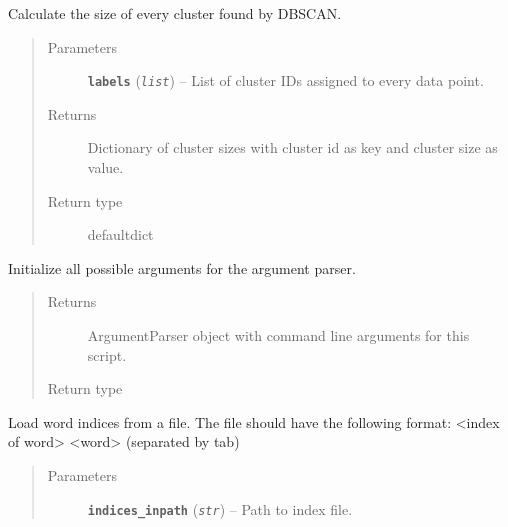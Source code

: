 \documentclass[letterpaper,10pt,english]{sphinxmanual}
\begin{document}

\begin{fulllineitems}
\label{src.clustering:src.clustering.cluster_mappings.get_cluster_size}
Calculate the size of every cluster found by DBSCAN.
\begin{quote}\begin{description}
\item[{Parameters}] \leavevmode
\textbf{\texttt{labels}} (\emph{\texttt{list}}) -- List of cluster IDs assigned to every data point.

\item[{Returns}] \leavevmode
Dictionary of cluster sizes with cluster id as key and cluster size as value.

\item[{Return type}] \leavevmode
defaultdict

\end{description}\end{quote}

\end{fulllineitems}


\begin{fulllineitems}
\label{src.clustering:src.clustering.cluster_mappings.init_argparser}
Initialize all possible arguments for the argument parser.
\begin{quote}\begin{description}
\item[{Returns}] \leavevmode
ArgumentParser object with command line arguments for this script.

\item[{Return type}] \leavevmode
{}

\end{description}\end{quote}

\end{fulllineitems}


\begin{fulllineitems}
\label{src.clustering:src.clustering.cluster_mappings.load_indices}
Load word indices from a file. The file should have the following format: \textless{}index of word\textgreater{}       \textless{}word\textgreater{} (separated by
tab)
\begin{quote}\begin{description}
\item[{Parameters}] \leavevmode
\textbf{\texttt{indices\_inpath}} (\emph{\texttt{str}}) -- Path to index file.

\end{description}\end{quote}

\end{fulllineitems}
\end{document}
